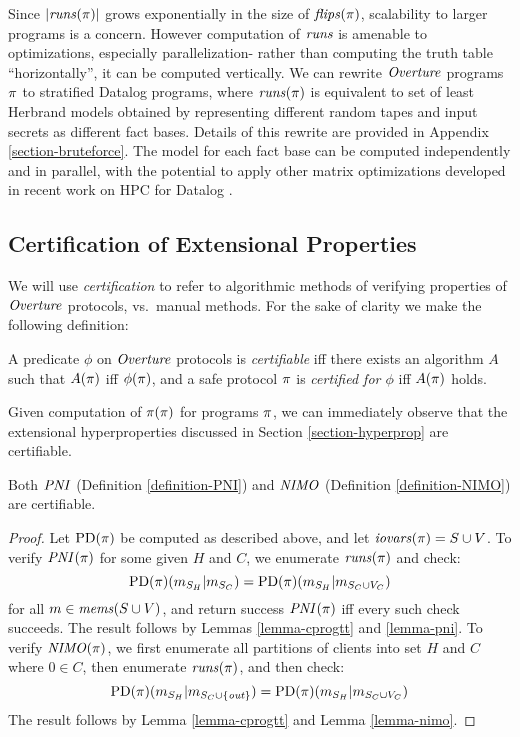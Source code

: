Since $|\mathit{runs}(\pi)|$ grows exponentially in the size of
$\mathit{flips}(\pi)$, scalability to larger programs is a concern.  However
computation of $\mathit{runs}$ is amenable to optimizations, especially
parallelization- rather than computing the truth table
``horizontally'', it can be computed vertically. We can rewrite
$\mathit{Overture}$ programs $\pi$ to stratified Datalog programs, where
$\mathit{runs}(\pi)$ is equivalent to set of least Herbrand models obtained
by representing different random tapes and input secrets as different
fact bases. Details of this rewrite are provided in Appendix
\ref{section-bruteforce}. The model for each fact base can be computed
independently and in parallel, with the potential to apply other
matrix optimizations developed in recent work on HPC for Datalog
\cite{sakama2017linear,aspis2018linear,nguyen2022enhancing,nguyen2021efficient}.

\subsection{Certification of Extensional Properties}
\label{section-automation-extensional}

We will use \emph{certification} to refer to algorithmic methods of
verifying properties of $\mathit{Overture}$ protocols, vs.~manual methods. For
the sake of clarity we make the following definition:
\begin{definition}
  A predicate $\phi$ on $\mathit{Overture}$ protocols is \emph{certifiable} iff
  there exists an algorithm $A$ such that $A(\pi)$ iff $\phi(\pi)$,
  and a safe protocol $\pi$ is \emph{certified for $\phi$} iff
  $A(\pi)$ holds.
\end{definition}

Given computation of $\pi(\pi)$ for programs $\pi$, we can
immediately observe that the extensional hyperproperties discussed in
Section \ref{section-hyperprop} are certifiable.
\begin{lemma}
  Both $\mathit{PNI}$ (Definition \ref{definition-PNI}) and $\mathit{NIMO}$ (Definition \ref{definition-NIMO}) are certifiable. 
\end{lemma}

\begin{proof}
  Let $\mathrm{PD}(\pi)$ be computed as described above, and let $\mathit{iovars}(\pi) = S
  \cup V$. To verify $\mathit{PNI}(\pi)$ for
  some given $H$ and $C$, we enumerate $\mathit{runs}(\pi)$ and check:
  $$
  \mathrm{PD}(\pi)(m_{S_H}|m_{S_C}) =
  \mathrm{PD}(\pi)(m_{S_H}|m_{S_C \cup V_C})
  $$
  for all $m \in \mathit{mems}(S \cup V)$, and return success $\mathit{PNI}(\pi)$ iff every such
  check succeeds. The result follows by Lemmas \ref{lemma-cprogtt} and \ref{lemma-pni}.
  To verify $\mathit{NIMO}(\pi)$, we first enumerate all partitions of clients
  into set $H$ and $C$ where $0 \in C$, then enumerate $\mathit{runs}(\pi)$, and
  then check:
  $$
  \mathrm{PD}(\pi)(m_{S_H}|m_{S_C \cup \{\mathit{out}\}}) =
  \mathrm{PD}(\pi)(m_{S_H}|m_{S_C \cup V_C})
  $$
  The result follows by Lemma \ref{lemma-cprogtt} and Lemma \ref{lemma-nimo}.
\end{proof}

